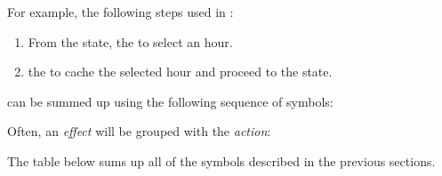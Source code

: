 \par\medskip

For example, the following steps used in :

\begin{enumerate}
  \item From the  state,  the  to select an hour.
  \item {} the  to cache the selected hour and proceed to the
     state.
\end{enumerate}

can be summed up using the following sequence of symbols:


Often, an \textit{effect} will be grouped with the \textit{action}:


The table below sums up all of the symbols described in the previous sections.

